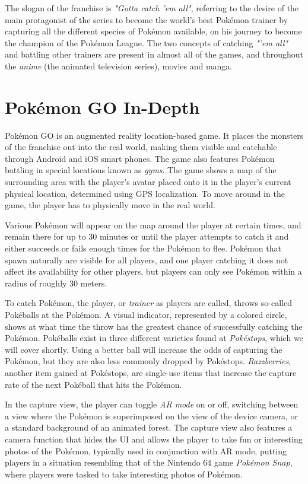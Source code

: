 The slogan of the franchise is \emph{"Gotta catch 'em all"}, referring to the desire of the main protagonist of the series to become the world's best Pokémon trainer by capturing all the different species of Pokémon available, on his journey to become the champion of the Pokémon League. The two concepts of catching \emph{"'em all"} and battling other trainers are present in almost all of the games, and throughout the \emph{anime} (the animated television series), movies and manga.

\section{Pokémon GO In-Depth}
\label{sec:pokemon-go-in-depth}

Pokémon GO is an augmented reality location-based game. It places the monsters of the franchise out into the real world, making them visible and catchable through Android and iOS smart phones. The game also features Pokémon battling in special locations known as \emph{gyms}. The game shows a map of the surrounding area with the player's avatar placed onto it in the player's current physical location, determined using GPS localization. To move around in the game, the player has to physically move in the real world.

Various Pokémon will appear on the map around the player at certain times, and remain there for up to 30 minutes or until the player attempts to catch it and either succeeds or fails enough times for the Pokémon to flee. Pokémon that spawn naturally are visible for all players, and one player catching it does not affect its availability for other players, but players can only see Pokémon within a radius of roughly 30 meters.

To catch Pokémon, the player, or \emph{trainer} as players are called, throws so-called Pokéballs at the Pokémon. A visual indicator, represented by a colored circle, shows at what time the throw has the greatest chance of successfully catching the Pokémon. Pokéballs exist in three different varieties found at \emph{Pokéstops}, which we will cover shortly. Using a better ball will increase the odds of capturing the Pokémon, but they are also less commonly dropped by Pokéstops. \emph{Razzberries}, another item gained at Pokéstops, are single-use items that increase the capture rate of the next Pokéball that hits the Pokémon.

In the capture view, the player can toggle \emph{AR mode} on or off, switching between a view where the Pokémon is superimposed on the view of the device camera, or a standard background of an animated forest. The capture view also features a camera function that hides the UI and allows the player to take fun or interesting photos of the Pokémon, typically used in conjunction with AR mode, putting players in a situation resembling that of the Nintendo 64 game \emph{Pokémon Snap}, where players were tasked to take interesting photos of Pokémon.

